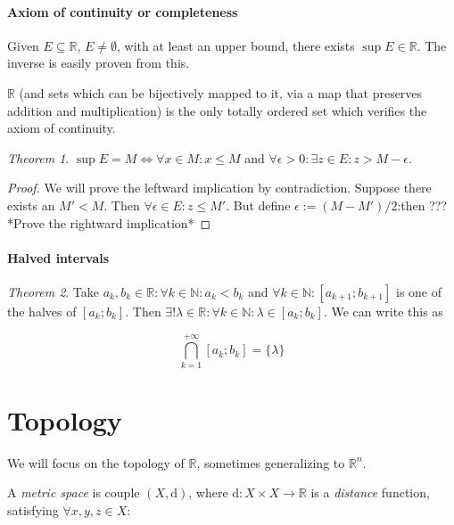 \documentclass[12pt,a4paper]{report}
\numberwithin{equation}{section}
\theoremstyle{definition}
\theoremstyle{remark}
\newtheorem{theorem}{Theorem}[section]
\begin{document}
\paragraph{Axiom of continuity or completeness} Given $E \subseteq \mathbb{R}$, $E\neq\emptyset$, with at least an upper bound, there exists $\sup E \in \mathbb{R}$. The inverse is easily proven from this.

$\mathbb{R}$ (and sets which can be bijectively mapped to it, via a map that preserves addition and multiplication) is the only totally ordered set which verifies the axiom of continuity.

\begin{theorem}
$\sup E = M \iff \forall x \in M: x \leq M$ and $\forall \epsilon > 0: \exists z \in E : z>M-\epsilon$.
\end{theorem}

\begin{proof}
We will prove the leftward implication by contradiction. Suppose there exists an $M'<M$. Then $\forall \epsilon \in E: z \leq M'$. But define $\epsilon := (M-M')/2$:then ???
*Prove the rightward implication*
\end{proof}

\paragraph{Halved intervals}

\begin{theorem}
Take $a_k, b_k \in \mathbb{R}: \forall k \in \mathbb{N}: a_k < b_k$ and $\forall k \in \mathbb{N}: [a_{k+1}; b_{k+1}]$ is one of the halves of $[a_k; b_k]$. Then $\exists ! \lambda \in \mathbb{R}: \forall k \in \mathbb{N}: \lambda \in [a_k; b_k]$. We can write this as

\begin{equation}
\bigcap_{k=1}^{+\infty} [a_k; b_k] = \lbrace \lambda \rbrace
\end{equation}
\end{theorem}

\section{Topology}

We will focus on the topology of $\mathbb{R}$, sometimes generalizing to $\mathbb{R}^n$.

A \emph{metric space} is couple $(X, \text{d})$, where $\text{d}: X\times X \rightarrow \mathbb{R}$ is a \emph{distance} function, satisfying $\forall x, y, z \in X$:
\end{document}
